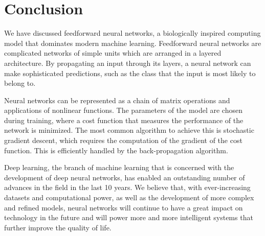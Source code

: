 \section{Conclusion}
\label{sec:conclusion}
We have discussed feedforward neural networks, a biologically inspired computing model that dominates modern machine learning. Feedforward neural networks are complicated networks of simple units which are arranged in a layered architecture. By propagating an input through its layers, a neural network can make sophisticated predictions, such as the class that the input is most likely to belong to.

Neural networks can be represented as a chain of matrix operations and applications of nonlinear functions. The parameters of the model are chosen during training, where a cost function that measures the performance of the network is minimized. The most common algorithm to achieve this is stochastic gradient descent, which requires the computation of the gradient of the cost function. This is efficiently handled by the back-propagation algorithm.

Deep learning, the branch of machine learning that is concerned with the development of deep neural networks, has enabled an outstanding number of advances in the field in the last 10 years. We believe that, with ever-increasing datasets and computational power, as well as the development of more complex and refined models, neural networks will continue to have a great impact on technology in the future and will power more and more intelligent systems that further improve the quality of life.